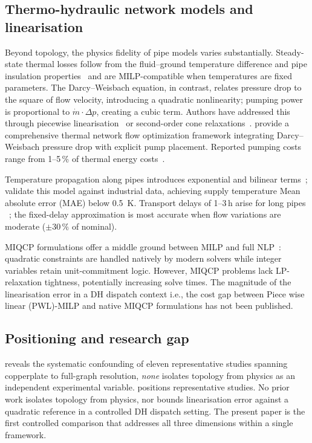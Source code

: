 \documentclass[a4paper,fleqn]{cas-dc}
\begin{document}
\subsection{Thermo-hydraulic network models and linearisation}
\label{sec:rw_thermohydraulic}

Beyond topology, the physics fidelity of pipe models varies
substantially. Steady-state thermal losses follow from the
fluid--ground temperature difference and pipe insulation
properties~\citep{Frederiksen2013} and are MILP-compatible when
temperatures are fixed parameters. The Darcy--Weisbach equation,
in contrast, relates pressure drop to the square of flow velocity,
introducing a quadratic nonlinearity; pumping power is proportional
to $\dot{m} \cdot \Delta p$, creating a cubic term. Authors have
addressed this through piecewise
linearisation~\citep{Bordin2016,Mertz2016} or second-order cone
relaxations~\citep{Blommaert2020}. \citet{Hari2024} provide a
comprehensive thermal network flow optimization framework
integrating Darcy--Weisbach pressure drop with explicit pump
placement. Reported pumping costs range from 1--5\,\% of thermal
energy costs~\citep{Frederiksen2013}.

Temperature propagation along pipes introduces exponential and
bilinear terms~\citep{vanderHeijde2017}; \citet{Maldonado2024}
validate this model against industrial data, achieving supply
temperature Mean absolute error (MAE) below \SI{0.5}{\kelvin}. Transport delays of 1--3\,h arise for
long pipes ~\citep{vanderHeijde2017,Giraud2015}; the
fixed-delay approximation is most accurate when flow variations
are moderate ($\pm 30\,\%$ of nominal).

MIQCP formulations offer a middle ground between MILP and full
NLP~\citep{Ommen2016}: quadratic constraints are handled natively
by modern solvers while integer variables retain unit-commitment
logic. However, MIQCP problems lack LP-relaxation tightness,
potentially increasing solve times. The magnitude of the
linearisation error in a DH dispatch context i.e., the cost gap
between Piece wise linear (PWL)-MILP and native MIQCP formulations has not been published.

\subsection{Positioning and research gap}
\label{sec:rw_summary}
 reveals the systematic confounding of
eleven representative studies spanning copperplate to full-graph
resolution, \emph{none} isolates topology from physics as an
independent experimental variable.
 positions representative studies. No prior work isolates topology from
physics, nor bounds linearisation error against a quadratic
reference in a controlled DH dispatch setting. The present paper is the first controlled comparison that addresses
all three dimensions within a single framework.
\end{document}
